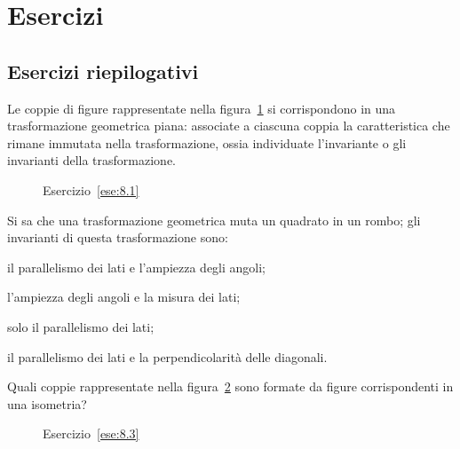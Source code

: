 
\section{Esercizi}

\subsection{Esercizi riepilogativi}

\begin{esercizio}
\label{ese:8.1}
Le coppie di figure rappresentate nella figura~\ref{fig:ese8.1} si 
corrispondono in una trasformazione geometrica piana: associate a 
ciascuna coppia la caratteristica che rimane immutata nella 
trasformazione, ossia individuate l'invariante o gli invarianti della 
trasformazione.
\end{esercizio}


\begin{inaccessibleblock}
 \begin{figure}[!htb]
	\centering
	\caption{Esercizio~\ref{ese:8.1}}\label{fig:ese8.1}
\end{figure}
\end{inaccessibleblock}

\begin{esercizio}
\label{ese:8.2}
Si sa che una trasformazione geometrica muta un quadrato in un rombo; 
gli invarianti di questa trasformazione sono:
\begin{enumeratea}
\item il parallelismo dei lati e l'ampiezza degli angoli;
\item l'ampiezza degli angoli e la misura dei lati;
\item solo il parallelismo 	dei lati;
\item il parallelismo dei lati e la perpendicolarità delle diagonali.
\end{enumeratea}
\end{esercizio}

\begin{esercizio}
\label{ese:8.3}
Quali coppie rappresentate nella figura~\ref{fig:ese8.3} sono formate 
da figure corrispondenti in una isometria?
\end{esercizio}


\begin{inaccessibleblock}
 \begin{figure}[!htb]
	\centering
	\caption{Esercizio~\ref{ese:8.3}}\label{fig:ese8.3}
\end{figure}
\end{inaccessibleblock}

